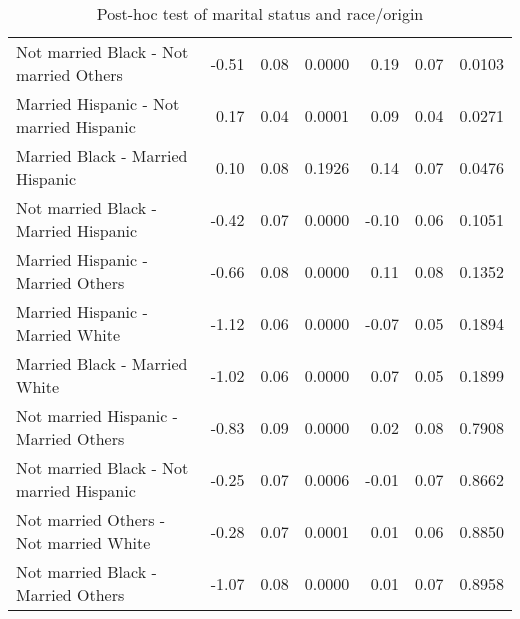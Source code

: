 \documentclass[11pt]{extarticle} %
\begin{document}
\begin{table}[H]
\begin{tabular}{lrrrrrr}
    Not married Black 	-  Not married Others & -0.51 & 0.08 & 0.0000 & 0.19 & 0.07 & 0.0103 \\ 
    Married Hispanic 	-  Not married Hispanic & 0.17 & 0.04 & 0.0001 & 0.09 & 0.04 & 0.0271 \\ 
    Married Black 	-  Married Hispanic & 0.10 & 0.08 & 0.1926 & 0.14 & 0.07 & 0.0476 \\ 
    Not married Black 	-  Married Hispanic & -0.42 & 0.07 & 0.0000 & -0.10 & 0.06 & 0.1051 \\ 
    Married Hispanic 	-  Married Others & -0.66 & 0.08 & 0.0000 & 0.11 & 0.08 & 0.1352 \\ 
    Married Hispanic 	-  Married White & -1.12 & 0.06 & 0.0000 & -0.07 & 0.05 & 0.1894 \\ 
    Married Black 	-  Married White & -1.02 & 0.06 & 0.0000 & 0.07 & 0.05 & 0.1899 \\ 
    Not married Hispanic -  Married Others & -0.83 & 0.09 & 0.0000 & 0.02 & 0.08 & 0.7908 \\ 
    Not married Black 	-  Not married Hispanic & -0.25 & 0.07 & 0.0006 & -0.01 & 0.07 & 0.8662 \\ 
    Not married Others 	-  Not married White & -0.28 & 0.07 & 0.0001 & 0.01 & 0.06 & 0.8850 \\ 
    Not married Black 	-  Married Others & -1.07 & 0.08 & 0.0000 & 0.01 & 0.07 & 0.8958 \\ 
  \hline
\end{tabular}
\caption{Post-hoc test of marital status and race/origin} 
\label{tab:RaceOriginMS}
\end{table}
\end{document}
